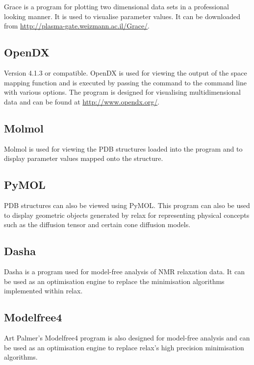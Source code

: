 Grace is a program for plotting two dimensional data sets in a professional looking manner.  It is used to visualise parameter values.  It can be downloaded from \href{http://plasma-gate.weizmann.ac.il/Grace/}{http://plasma-gate.weizmann.ac.il/Grace/}.


\subsection{OpenDX}

Version 4.1.3 or compatible.  OpenDX is used for viewing the output of the space mapping function and is executed by passing the command  to the command line with various options.  The program is designed for visualising multidimensional data and can be found at \href{http://www.opendx.org/}{http://www.opendx.org/}.


\subsection{Molmol}

Molmol is used for viewing the PDB structures loaded into the program and to display parameter values mapped onto the structure.


\subsection{PyMOL}

PDB structures can also be viewed using PyMOL.  This program can also be used to display geometric objects generated by relax for representing physical concepts such as the diffusion tensor and certain cone diffusion models.


\subsection{Dasha}

Dasha is a program used for model-free analysis of NMR relaxation data.  It can be used as an optimisation engine to replace the minimisation algorithms implemented within relax.


\subsection{Modelfree4}

Art Palmer's Modelfree4 program is also designed for model-free analysis and can be used as an optimisation engine to replace relax's high precision minimisation algorithms.
